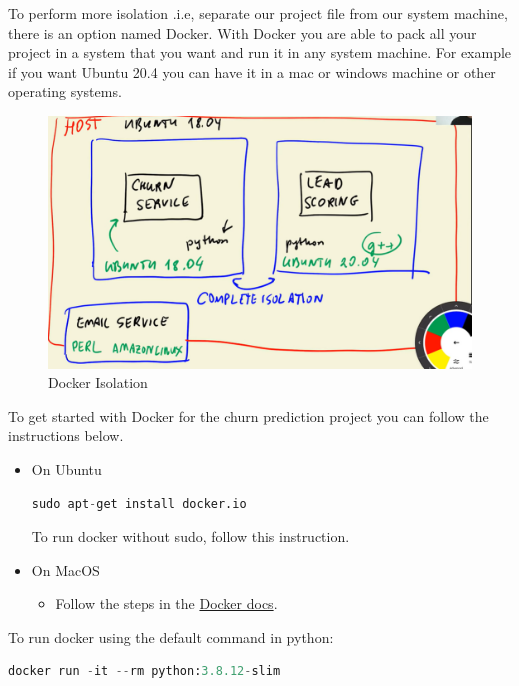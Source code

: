 \documentclass[letterpaper,12pt,notitlepage,twoside]{report}
\begin{document}
To perform more isolation .i.e,  separate our project file from our system machine, there is an option named Docker. With Docker you are able to pack all your project in a system that you want and run it in any system machine. For example if you want Ubuntu 20.4 you can have it in a mac or windows machine or other operating systems. 

\begin{figure}[h]
	\centering
	\includegraphics[width=\textwidth]{Images/docker-isolation.png}
	\caption{Docker Isolation}
	\label{fig:11}
\end{figure}

To get started with Docker for the churn prediction project you can follow the instructions below.

\begin{itemize}
\item On Ubuntu
\begin{lstlisting}[language=python, numbers=none]
sudo apt-get install docker.io
\end{lstlisting}

To run docker without sudo, follow this instruction.

\item On MacOS
	\begin{itemize}[noitemsep, topsep=0pt]
		\item Follow the steps in the \href{https://docs.docker.com/desktop/install/mac-install/}{Docker docs}.
	\end{itemize}
\end{itemize}

To run docker using the default command in python:
\begin{lstlisting}[language=python, numbers=none]
docker run -it --rm python:3.8.12-slim
\end{lstlisting}
\end{document}
